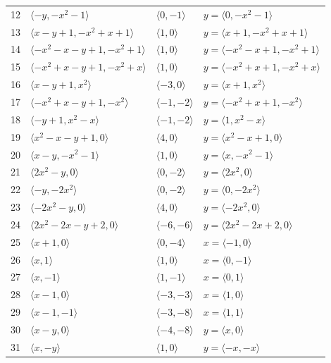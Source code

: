 \documentclass[11pt]{article}
\begin{document}
\begin{longtable}{@{}rlll@{}}
12 & $\langle -y,-x^{2}-1\rangle$ & $\langle 0,-1\rangle$ & $y=\langle 0,-x^{2}-1\rangle$\\
13 & $\langle x-y+1,-x^{2}+x+1\rangle$ & $\langle 1,0\rangle$ & $y=\langle x+1,-x^{2}+x+1\rangle$\\
14 & $\langle -x^{2}-x-y+1,-x^{2}+1\rangle$ & $\langle 1,0\rangle$ & $y=\langle -x^{2}-x+1,-x^{2}+1\rangle$\\
15 & $\langle -x^{2}+x-y+1,-x^{2}+x\rangle$ & $\langle 1,0\rangle$ & $y=\langle -x^{2}+x+1,-x^{2}+x\rangle$\\
16 & $\langle x-y+1,x^{2}\rangle$ & $\langle -3,0\rangle$ & $y=\langle x+1,x^{2}\rangle$\\
17 & $\langle -x^{2}+x-y+1,-x^{2}\rangle$ & $\langle -1,-2\rangle$ & $y=\langle -x^{2}+x+1,-x^{2}\rangle$\\
18 & $\langle -y+1,x^{2}-x\rangle$ & $\langle -1,-2\rangle$ & $y=\langle 1,x^{2}-x\rangle$\\
19 & $\langle x^{2}-x-y+1,0\rangle$ & $\langle 4,0\rangle$ & $y=\langle x^{2}-x+1,0\rangle$\\
20 & $\langle x-y,-x^{2}-1\rangle$ & $\langle 1,0\rangle$ & $y=\langle x,-x^{2}-1\rangle$\\
21 & $\langle 2x^{2}-y,0\rangle$ & $\langle 0,-2\rangle$ & $y=\langle 2x^{2},0\rangle$\\
22 & $\langle -y,-2x^{2}\rangle$ & $\langle 0,-2\rangle$ & $y=\langle 0,-2x^{2}\rangle$\\
23 & $\langle -2x^{2}-y,0\rangle$ & $\langle 4,0\rangle$ & $y=\langle -2x^{2},0\rangle$\\
24 & $\langle 2x^{2}-2x-y+2,0\rangle$ & $\langle -6,-6\rangle$ & $y=\langle 2x^{2}-2x+2,0\rangle$\\
25 & $\langle x+1,0\rangle$ & $\langle 0,-4\rangle$ & $x=\langle -1,0\rangle$\\
26 & $\langle x,1\rangle$ & $\langle 1,0\rangle$ & $x=\langle 0,-1\rangle$\\
27 & $\langle x,-1\rangle$ & $\langle 1,-1\rangle$ & $x=\langle 0,1\rangle$\\
28 & $\langle x-1,0\rangle$ & $\langle -3,-3\rangle$ & $x=\langle 1,0\rangle$\\
29 & $\langle x-1,-1\rangle$ & $\langle -3,-8\rangle$ & $x=\langle 1,1\rangle$\\
30 & $\langle x-y,0\rangle$ & $\langle -4,-8\rangle$ & $y=\langle x,0\rangle$\\
31 & $\langle x,-y\rangle$ & $\langle 1,0\rangle$ & $y=\langle -x,-x\rangle$\\

\end{longtable}
\end{document}
